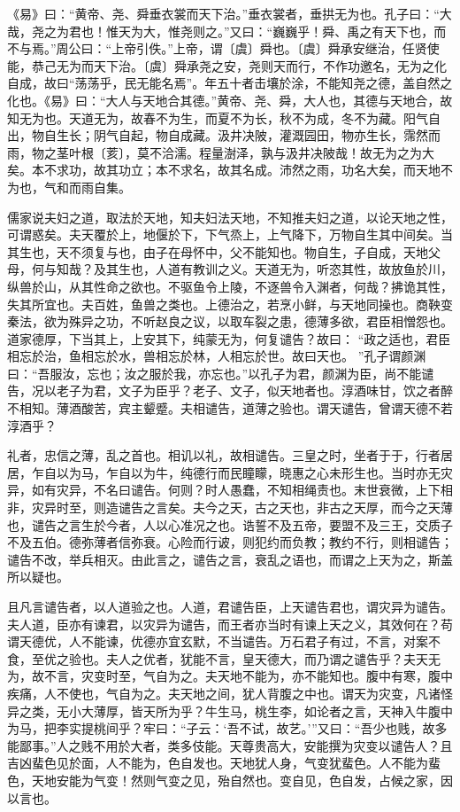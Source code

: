 \documentclass[]{article}
\begin{document}
《易》曰：``黄帝、尧、舜垂衣裳而天下治。''垂衣裳者，垂拱无为也。孔子曰：``大哉，尧之为君也！惟天为大，惟尧则之。''又曰：``巍巍乎！舜、禹之有天下也，而不与焉。''周公曰：``上帝引佚。''上帝，谓〔虞〕舜也。〔虞〕舜承安继治，任贤使能，恭己无为而天下治。〔虞〕舜承尧之安，尧则天而行，不作功邀名，无为之化自成，故曰``荡荡乎，民无能名焉''。年五十者击壤於涂，不能知尧之德，盖自然之化也。《易》曰：``大人与天地合其德。''黄帝、尧、舜，大人也，其德与天地合，故知无为也。天道无为，故春不为生，而夏不为长，秋不为成，冬不为藏。阳气自出，物自生长；阴气自起，物自成藏。汲井决陂，灌溉园田，物亦生长，霈然而雨，物之茎叶根〔荄〕，莫不洽濡。程量澍泽，孰与汲井决陂哉！故无为之为大矣。本不求功，故其功立；本不求名，故其名成。沛然之雨，功名大矣，而天地不为也，气和而雨自集。

儒家说夫妇之道，取法於天地，知夫妇法天地，不知推夫妇之道，以论天地之性，可谓惑矣。夫天覆於上，地偃於下，下气烝上，上气降下，万物自生其中间矣。当其生也，天不须复与也，由子在母怀中，父不能知也。物自生，子自成，天地父母，何与知哉？及其生也，人道有教训之义。天道无为，听恣其性，故放鱼於川，纵兽於山，从其性命之欲也。不驱鱼令上陵，不逐兽令入渊者，何哉？拂诡其性，失其所宜也。夫百姓，鱼兽之类也。上德治之，若烹小鲜，与天地同操也。商鞅变秦法，欲为殊异之功，不听赵良之议，以取车裂之患，德薄多欲，君臣相憎怨也。道家德厚，下当其上，上安其下，纯蒙无为，何复谴告？故曰：
``政之适也，君臣相忘於治，鱼相忘於水，兽相忘於林，人相忘於世。故曰天也。
''孔子谓颜渊曰：``吾服汝，忘也；汝之服於我，亦忘也。''以孔子为君，颜渊为臣，尚不能谴告，况以老子为君，文子为臣乎？老子、文子，似天地者也。淳酒味甘，饮之者醉不相知。薄酒酸苦，宾主颦蹙。夫相谴告，道薄之验也。谓天谴告，曾谓天德不若淳酒乎？

礼者，忠信之薄，乱之首也。相讥以礼，故相谴告。三皇之时，坐者于于，行者居居，乍自以为马，乍自以为牛，纯德行而民瞳矇，晓惠之心未形生也。当时亦无灾异，如有灾异，不名曰谴告。何则？时人愚蠢，不知相绳责也。末世衰微，上下相非，灾异时至，则造谴告之言矣。夫今之天，古之天也，非古之天厚，而今之天薄也，谴告之言生於今者，人以心准况之也。诰誓不及五帝，要盟不及三王，交质子不及五伯。德弥薄者信弥衰。心险而行诐，则犯约而负教；教约不行，则相谴告；谴告不改，举兵相灭。由此言之，谴告之言，衰乱之语也，而谓之上天为之，斯盖所以疑也。

且凡言谴告者，以人道验之也。人道，君谴告臣，上天谴告君也，谓灾异为谴告。夫人道，臣亦有谏君，以灾异为谴告，而王者亦当时有谏上天之义，其效何在？苟谓天德优，人不能谏，优德亦宜玄默，不当谴告。万石君子有过，不言，对案不食，至优之验也。夫人之优者，犹能不言，皇天德大，而乃谓之谴告乎？夫天无为，故不言，灾变时至，气自为之。夫天地不能为，亦不能知也。腹中有寒，腹中疾痛，人不使也，气自为之。夫天地之间，犹人背腹之中也。谓天为灾变，凡诸怪异之类，无小大薄厚，皆天所为乎？牛生马，桃生李，如论者之言，天神入牛腹中为马，把李实提桃间乎？牢曰：``子云：`吾不试，故艺。'''又曰：``吾少也贱，故多能鄙事。''人之贱不用於大者，类多伎能。天尊贵高大，安能撰为灾变以谴告人？且吉凶蜚色见於面，人不能为，色自发也。天地犹人身，气变犹蜚色。人不能为蜚色，天地安能为气变！然则气变之见，殆自然也。变自见，色自发，占候之家，因以言也。
\end{document}
